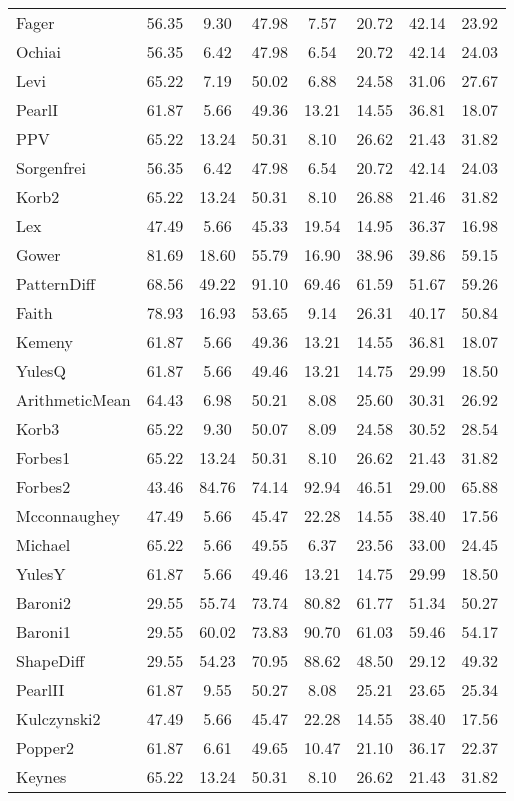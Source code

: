 \begin{tabular}{l||c|c|c|c|c|c|c}
Fager& 56.35& 9.30& 47.98& 7.57& 20.72& 42.14& 23.92\\
Ochiai& 56.35& 6.42& 47.98& 6.54& 20.72& 42.14& 24.03\\
Levi& 65.22& 7.19& 50.02& 6.88& 24.58& 31.06& 27.67\\
PearlI& 61.87& 5.66& 49.36& 13.21& 14.55& 36.81& 18.07\\
PPV& 65.22& 13.24& 50.31& 8.10& 26.62& 21.43& 31.82\\
Sorgenfrei& 56.35& 6.42& 47.98& 6.54& 20.72& 42.14& 24.03\\
Korb2& 65.22& 13.24& 50.31& 8.10& 26.88& 21.46& 31.82\\
Lex& 47.49& 5.66& 45.33& 19.54& 14.95& 36.37& 16.98\\
Gower& 81.69& 18.60& 55.79& 16.90& 38.96& 39.86& 59.15\\
PatternDiff& 68.56& 49.22& 91.10& 69.46& 61.59& 51.67& 59.26\\
Faith& 78.93& 16.93& 53.65& 9.14& 26.31& 40.17& 50.84\\
Kemeny& 61.87& 5.66& 49.36& 13.21& 14.55& 36.81& 18.07\\
YulesQ& 61.87& 5.66& 49.46& 13.21& 14.75& 29.99& 18.50\\
ArithmeticMean& 64.43& 6.98& 50.21& 8.08& 25.60& 30.31& 26.92\\
Korb3& 65.22& 9.30& 50.07& 8.09& 24.58& 30.52& 28.54\\
Forbes1& 65.22& 13.24& 50.31& 8.10& 26.62& 21.43& 31.82\\
Forbes2& 43.46& 84.76& 74.14& 92.94& 46.51& 29.00& 65.88\\
Mcconnaughey& 47.49& 5.66& 45.47& 22.28& 14.55& 38.40& 17.56\\
Michael& 65.22& 5.66& 49.55& 6.37& 23.56& 33.00& 24.45\\
YulesY& 61.87& 5.66& 49.46& 13.21& 14.75& 29.99& 18.50\\
Baroni2& 29.55& 55.74& 73.74& 80.82& 61.77& 51.34& 50.27\\
Baroni1& 29.55& 60.02& 73.83& 90.70& 61.03& 59.46& 54.17\\
ShapeDiff& 29.55& 54.23& 70.95& 88.62& 48.50& 29.12& 49.32\\
PearlII& 61.87& 9.55& 50.27& 8.08& 25.21& 23.65& 25.34\\
Kulczynski2& 47.49& 5.66& 45.47& 22.28& 14.55& 38.40& 17.56\\
Popper2& 61.87& 6.61& 49.65& 10.47& 21.10& 36.17& 22.37\\
Keynes& 65.22& 13.24& 50.31& 8.10& 26.62& 21.43& 31.82\\

\end{tabular}
